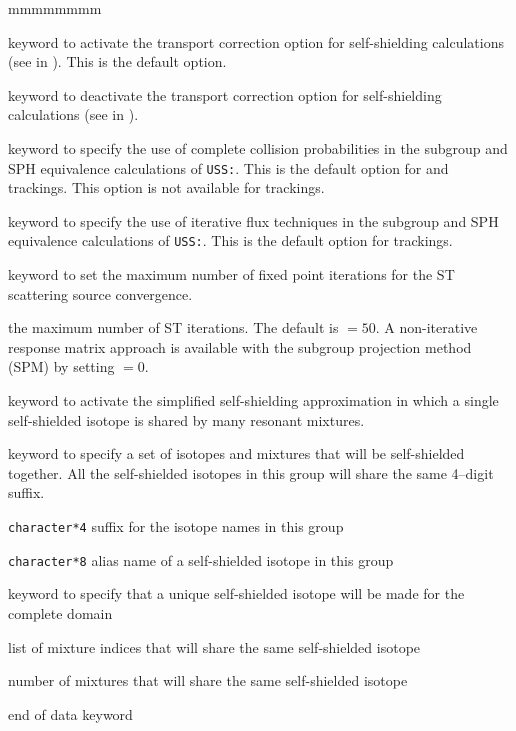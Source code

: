 \begin{ListeDeDescription}{mmmmmmmm}
\item[\moc{TRAN}] keyword to activate the transport correction option for
self-shielding calculations (see  in ). This
is the default option.

\item[\moc{NOTR}] keyword to deactivate the transport correction option for
self-shielding calculations (see  in ).

\item[\moc{PIJ}] keyword to specify the use of complete collision
probabilities in the subgroup and SPH equivalence calculations of {\tt USS:}.
This is the default option for  and  trackings.
This option is not available for  trackings.

\item[\moc{ARM}] keyword to specify the use of iterative flux techniques
in the subgroup and SPH equivalence calculations of {\tt USS:}.
This is the default option for  trackings.

\item[\moc{MAXST}] keyword to set the maximum number of fixed point iterations
for the ST scattering source convergence.

\item[\dusa{imax}] the maximum number of ST iterations. The default is
 $=50$. A non-iterative response matrix approach is available with
the subgroup projection method (SPM) by setting  $=0$.

\item[\moc{CALC}] keyword to activate the simplified self-shielding
approximation in which a single self-shielded isotope is shared by many
resonant mixtures.

\item[\moc{REGI}] keyword to specify a set of isotopes and mixtures that
will be self-shielded together. All the self-shielded isotopes in this group
will share the same 4--digit suffix.

\item[\dusa{suffix}] {\tt character*4} suffix for the isotope names in this
group

\item[\dusa{isot}] {\tt character*8} alias name of a self-shielded isotope in this
group

\item[\moc{ALL}] keyword to specify that a unique self-shielded isotope will be
made for the complete domain

\item[\dusa{imix}] list of mixture indices that will share the same self-shielded
isotope

\item[\dusa{nmix}] number of mixtures that will share the same self-shielded
isotope

\item[\moc{ENDC}] end of  data keyword

\end{ListeDeDescription}

